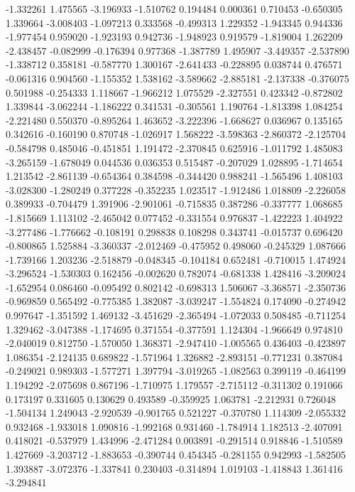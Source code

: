 -1.332261
1.475565
-3.196933
-1.510762
0.194484
0.000361
0.710453
-0.650305
1.339664
-3.008403
-1.097213
0.333568
-0.499313
1.229352
-1.943345
0.944336
-1.977454
0.959020
-1.923193
0.942736
-1.948923
0.919579
-1.819004
1.262209
-2.438457
-0.082999
-0.176394
0.977368
-1.387789
1.495907
-3.449357
-2.537890
-1.338712
0.358181
-0.587770
1.300167
-2.641433
-0.228895
0.038744
0.476571
-0.061316
0.904560
-1.155352
1.538162
-3.589662
-2.885181
-2.137338
-0.376075
0.501988
-0.254333
1.118667
-1.966212
1.075529
-2.327551
0.423342
-0.872802
1.339844
-3.062244
-1.186222
0.341531
-0.305561
1.190764
-1.813398
1.084254
-2.221480
0.550370
-0.895264
1.463652
-3.222396
-1.668627
0.036967
0.135165
0.342616
-0.160190
0.870748
-1.026917
1.568222
-3.598363
-2.860372
-2.125704
-0.584798
0.485046
-0.451851
1.191472
-2.370845
0.625916
-1.011792
1.485083
-3.265159
-1.678049
0.044536
0.036353
0.515487
-0.207029
1.028895
-1.714654
1.213542
-2.861139
-0.654364
0.384598
-0.344420
0.988241
-1.565496
1.408103
-3.028300
-1.280249
0.377228
-0.352235
1.023517
-1.912486
1.018809
-2.226058
0.389933
-0.704479
1.391906
-2.901061
-0.715835
0.387286
-0.337777
1.068685
-1.815669
1.113102
-2.465042
0.077452
-0.331554
0.976837
-1.422223
1.404922
-3.277486
-1.776662
-0.108191
0.298838
0.108298
0.343741
-0.015737
0.696420
-0.800865
1.525884
-3.360337
-2.012469
-0.475952
0.498060
-0.245329
1.087666
-1.739166
1.203236
-2.518879
-0.048345
-0.104184
0.652481
-0.710015
1.474924
-3.296524
-1.530303
0.162456
-0.002620
0.782074
-0.681338
1.428416
-3.209024
-1.652954
0.086460
-0.095492
0.802142
-0.698313
1.506067
-3.368571
-2.350736
-0.969859
0.565492
-0.775385
1.382087
-3.039247
-1.554824
0.174090
-0.274942
0.997647
-1.351592
1.469132
-3.451629
-2.365494
-1.072033
0.508485
-0.711254
1.329462
-3.047388
-1.174695
0.371554
-0.377591
1.124304
-1.966649
0.974810
-2.040019
0.812750
-1.570050
1.368371
-2.947410
-1.005565
0.436403
-0.423897
1.086354
-2.124135
0.689822
-1.571964
1.326882
-2.893151
-0.771231
0.387084
-0.249021
0.989303
-1.577271
1.397794
-3.019265
-1.082563
0.399119
-0.464199
1.194292
-2.075698
0.867196
-1.710975
1.179557
-2.715112
-0.311302
0.191066
0.173197
0.331605
0.130629
0.493589
-0.359925
1.063781
-2.212931
0.726048
-1.504134
1.249043
-2.920539
-0.901765
0.521227
-0.370780
1.114309
-2.055332
0.932468
-1.933018
1.090816
-1.992168
0.931460
-1.784914
1.182513
-2.407091
0.418021
-0.537979
1.434996
-2.471284
0.003891
-0.291514
0.918846
-1.510589
1.427669
-3.203712
-1.883653
-0.390744
0.454345
-0.281155
0.942993
-1.582505
1.393887
-3.072376
-1.337841
0.230403
-0.314894
1.019103
-1.418843
1.361416
-3.294841
